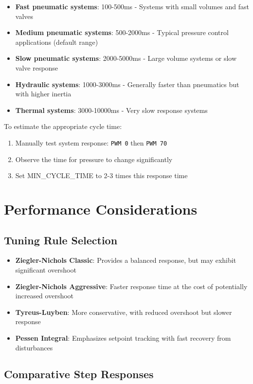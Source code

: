 \documentclass[a4paper,11pt]{article}
\begin{document}
\begin{itemize}
    \item \textbf{Fast pneumatic systems}: 100-500ms - Systems with small volumes and fast valves
    \item \textbf{Medium pneumatic systems}: 500-2000ms - Typical pressure control applications (default range)
    \item \textbf{Slow pneumatic systems}: 2000-5000ms - Large volume systems or slow valve response
    \item \textbf{Hydraulic systems}: 1000-3000ms - Generally faster than pneumatics but with higher inertia
    \item \textbf{Thermal systems}: 3000-10000ms - Very slow response systems
\end{itemize}

To estimate the appropriate cycle time:
\begin{enumerate}
    \item Manually test system response: \texttt{PWM 0} then \texttt{PWM 70}
    \item Observe the time for pressure to change significantly
    \item Set MIN\_CYCLE\_TIME to 2-3 times this response time
\end{enumerate}

\section{Performance Considerations}

\subsection{Tuning Rule Selection}

\begin{itemize}
    \item \textbf{Ziegler-Nichols Classic}: Provides a balanced response, but may exhibit significant overshoot
    \item \textbf{Ziegler-Nichols Aggressive}: Faster response time at the cost of potentially increased overshoot
    \item \textbf{Tyreus-Luyben}: More conservative, with reduced overshoot but slower response
    \item \textbf{Pessen Integral}: Emphasizes setpoint tracking with fast recovery from disturbances
\end{itemize}

\subsection{Comparative Step Responses}
\end{document}
